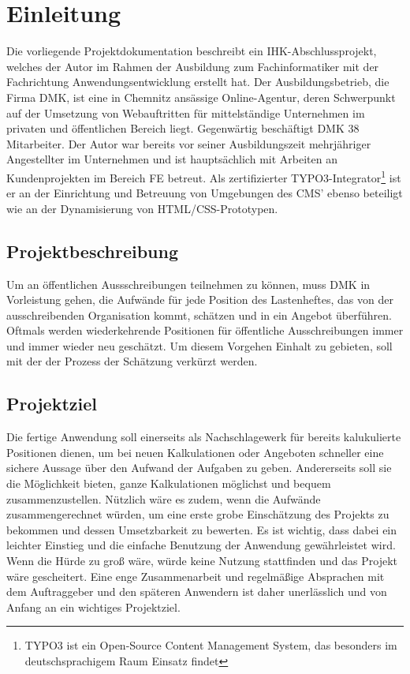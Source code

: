 \section{Einleitung}
\label{sec:Einleitung}
Die vorliegende Projektdokumentation beschreibt ein IHK-Abschlussprojekt,
welches der Autor im Rahmen der Ausbildung zum Fachinformatiker mit der
Fachrichtung Anwendungsentwicklung erstellt hat. Der Ausbildungsbetrieb, die
Firma \ac{DMK}, ist eine in Chemnitz ansässige Online-Agentur, deren Schwerpunkt
auf der Umsetzung von Webauftritten für mittelständige Unternehmen im privaten
und öffentlichen Bereich liegt. Gegenwärtig beschäftigt \acs{DMK} 38
Mitarbeiter. Der Autor war bereits vor seiner Ausbildungszeit
mehrjähriger Angestellter im Unternehmen und ist hauptsächlich mit Arbeiten an
Kundenprojekten im Bereich \ac{FE} betreut. Als zertifizierter
TYPO3-Integrator\footnote{TYPO3 ist ein Open-Source Content Management System,
das besonders im deutschsprachigem Raum Einsatz findet} ist er an der
Einrichtung und Betreuung von Umgebungen des \acs{CMS}' ebenso beteiligt wie an
der Dynamisierung von \acs{HTML}/\acs{CSS}-Prototypen.

\subsection{Projektbeschreibung} 
\label{sec:Projektbeschreibung}
Um an öffentlichen Aussschreibungen teilnehmen zu können, muss
\acs{DMK} in Vorleistung gehen, die Aufwände für jede Position des Lastenheftes,
das von der ausschreibenden Organisation kommt, schätzen und in ein Angebot
überführen. Oftmals werden wiederkehrende Positionen für öffentliche
Ausschreibungen immer und immer wieder neu geschätzt. Um diesem Vorgehen Einhalt
zu gebieten, soll mit der {\titel} der Prozess der Schätzung verkürzt werden.

\subsection{Projektziel} 
\label{sec:Projektziel}
Die fertige Anwendung soll einerseits als Nachschlagewerk für bereits
kalukulierte Positionen dienen, um bei neuen Kalkulationen oder Angeboten
schneller eine sichere Aussage über den Aufwand der Aufgaben zu geben.
Andererseits soll sie die Möglichkeit bieten, ganze Kalkulationen möglichst und
bequem zusammenzustellen. Nützlich wäre es zudem, wenn die Aufwände
zusammengerechnet würden, um eine erste grobe Einschätzung des
Projekts zu bekommen und dessen Umsetzbarkeit zu bewerten. Es ist wichtig, dass
dabei ein leichter Einstieg und die einfache Benutzung der Anwendung
gewährleistet wird. Wenn die Hürde zu groß wäre, würde keine Nutzung stattfinden
und das Projekt wäre gescheitert. Eine enge Zusammenarbeit und regelmäßige
Absprachen mit dem Auftraggeber und den späteren Anwendern ist daher
unerlässlich und von Anfang an ein wichtiges Projektziel.

